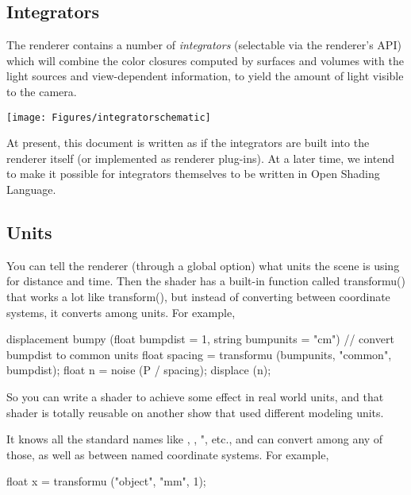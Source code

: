 \documentclass[11pt,letterpaper]{book}
\def\langname{Open Shading Language\xspace}
\begin{document}
\subsection*{Integrators}

The renderer contains a number of \emph{integrators} (selectable via the
renderer's API) which will combine the color closures computed by
surfaces and volumes with the light sources and view-dependent
information, to yield the amount of light visible to the camera.

\bigskip

\texttt{[image: Figures/integratorschematic]}

\medskip

\begin{annotate}
At present, this document is written as if the integrators are built
into the renderer itself (or implemented as renderer plug-ins).  At a
later time, we intend to make it possible for integrators themselves
to be written in \langname.
\end{annotate}

\subsection*{Units}

You can tell the renderer (through a global option) what units the scene
is using for distance and time.  Then the shader has a built-in function
called {\cf transformu()} that works a lot like {\cf transform()}, but
instead of converting between coordinate systems, it converts among
units.  For example,

\begin{code}
    displacement bumpy (float bumpdist = 1,
                        string bumpunits = "cm")
    {
        // convert bumpdist to common units
        float spacing = transformu (bumpunits, "common", bumpdist);
        float n = noise (P / spacing);
        displace (n);
    }
\end{code}

So you can write a shader to achieve some effect in real world units,
and that shader is totally reusable on another show that used different
modeling units.

It knows all the standard names like , , ",
etc., and can convert among any of those, as well as between named
coordinate systems.  For example,

\begin{code}
    float x = transformu ("object", "mm", 1);
\end{code}
\end{document}

